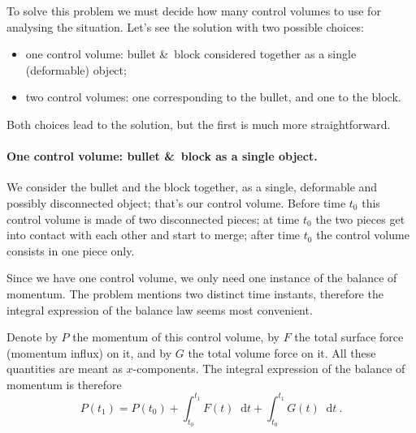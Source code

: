 \documentclass[a4paper,12pt,%
onecolumn,oneside,%
british%
]{memoir}
\newcommand*{\amp}{\&}
\newcommand*{\di}{\mathop{}\!\mathrm{d}}%
\renewcommand*{\|}[1][]{\nonscript\:#1\vert\nonscript\:\mathopen{}}
\newcommand*{\yti}{t_{0}}
\newcommand*{\ytf}{t_{1}}
\newcommand*{\dt}{\di t}
\begin{document}
To solve this problem we must decide how many control volumes to use for analysing the situation. Let's see the solution with two possible choices:
\begin{itemize}[nosep]
\item one control volume: bullet \amp\ block considered together as a single (deformable) object;
\item two control volumes: one corresponding to the bullet, and one to the block.
\end{itemize}
Both choices lead to the solution, but the first is much more straightforward.


\paragraph{One control volume: bullet \amp\ block as a single object.}

We consider the bullet and the block together, as a single, deformable and possibly disconnected object; that's our control volume. Before time $\yti$ this control volume is made of two disconnected pieces; at time $\yti$ the two pieces get into contact with each other and start to merge; after time $\yti$ the control volume consists in one piece only.

Since we have one control volume, we only need one instance of the balance of momentum. The problem mentions two distinct time instants, therefore the integral expression of the balance law seems most convenient.

Denote by $P$ the momentum of this control volume, by $F$ the total surface force (momentum influx) on it, and by $G$ the total volume force on it. All these quantities are meant as $x$-components. The integral expression of the balance of momentum is therefore
\begin{equation*}
  P(\ytf) = P(\yti)
  + \int_{\yti}^{\ytf}\!F(t)\dt
  + \int_{\yti}^{\ytf}\!G(t) \dt \ .
\end{equation*}
\end{document}
